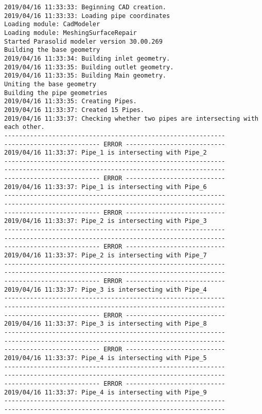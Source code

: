 \documentclass{article}
\begin{document}
{\tiny 
\begin{verbatim}
2019/04/16 11:33:33: Beginning CAD creation.
2019/04/16 11:33:33: Loading pipe coordinates
Loading module: CadModeler
Loading module: MeshingSurfaceRepair
Started Parasolid modeler version 30.00.269
Building the base geometry
2019/04/16 11:33:34: Building inlet geometry.
2019/04/16 11:33:35: Building outlet geometry.
2019/04/16 11:33:35: Building Main geometry.
Uniting the base geometry
Building the pipe geometries
2019/04/16 11:33:35: Creating Pipes.
2019/04/16 11:33:37: Created 15 Pipes.
2019/04/16 11:33:37: Checking whether two pipes are intersecting with each other.
------------------------------------------------------------
-------------------------- ERROR ---------------------------
2019/04/16 11:33:37: Pipe_1 is intersecting with Pipe_2
------------------------------------------------------------
------------------------------------------------------------
-------------------------- ERROR ---------------------------
2019/04/16 11:33:37: Pipe_1 is intersecting with Pipe_6
------------------------------------------------------------
------------------------------------------------------------
-------------------------- ERROR ---------------------------
2019/04/16 11:33:37: Pipe_2 is intersecting with Pipe_3
------------------------------------------------------------
------------------------------------------------------------
-------------------------- ERROR ---------------------------
2019/04/16 11:33:37: Pipe_2 is intersecting with Pipe_7
------------------------------------------------------------
------------------------------------------------------------
-------------------------- ERROR ---------------------------
2019/04/16 11:33:37: Pipe_3 is intersecting with Pipe_4
------------------------------------------------------------
------------------------------------------------------------
-------------------------- ERROR ---------------------------
2019/04/16 11:33:37: Pipe_3 is intersecting with Pipe_8
------------------------------------------------------------
------------------------------------------------------------
-------------------------- ERROR ---------------------------
2019/04/16 11:33:37: Pipe_4 is intersecting with Pipe_5
------------------------------------------------------------
------------------------------------------------------------
-------------------------- ERROR ---------------------------
2019/04/16 11:33:37: Pipe_4 is intersecting with Pipe_9
------------------------------------------------------------
------------------------------------------------------------

\end{verbatim}}
\end{document}
